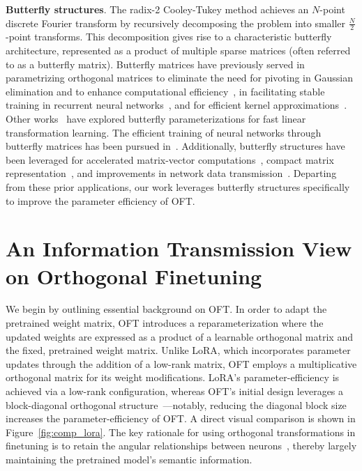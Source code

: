 \textbf{Butterfly structures}. The radix-2 Cooley-Tukey method achieves an $N$-point discrete Fourier transform by recursively decomposing the problem into smaller $\frac{N}{2}$-point transforms. This decomposition gives rise to a characteristic butterfly architecture, represented as a product of multiple sparse matrices (often referred to as a butterfly matrix). Butterfly matrices have previously served in parametrizing orthogonal matrices to eliminate the need for pivoting in Gaussian elimination and to enhance computational efficiency~\cite{parker1995random}, in facilitating stable training in recurrent neural networks~\cite{jing2017tunable}, and for efficient kernel approximations~\cite{munkhoeva2018quadrature}. Other works~\cite{dao2019learning,dao2019kaleidoscope} have explored butterfly parameterizations for fast linear transformation learning. The efficient training of neural networks through butterfly matrices has been pursued in~\cite{chen2022pixelated,dao2022monarch}. Additionally, butterfly structures have been leveraged for accelerated matrix-vector computations~\cite{michielssen1996multilevel,o2010algorithm}, compact matrix representation~\cite{li2015butterfly}, and improvements in network data transmission~\cite{klasing1994broadcasting,li2003linear,rajasingh2016transmission}. Departing from these prior applications, our work leverages butterfly structures specifically to improve the parameter efficiency of OFT.

\section{An Information Transmission View on Orthogonal Finetuning}

We begin by outlining essential background on OFT. In order to adapt the pretrained weight matrix, OFT introduces a reparameterization where the updated weights are expressed as a product of a learnable orthogonal matrix and the fixed, pretrained weight matrix. Unlike LoRA, which incorporates parameter updates through the addition of a low-rank matrix, OFT employs a multiplicative orthogonal matrix for its weight modifications. LoRA's parameter-efficiency is achieved via a low-rank configuration, whereas OFT's initial design leverages a block-diagonal orthogonal structure~\cite{qiu2023controlling}—notably, reducing the diagonal block size increases the parameter-efficiency of OFT. A direct visual comparison is shown in Figure~\ref{fig:comp_lora}. The key rationale for using orthogonal transformations in finetuning is to retain the angular relationships between neurons~\cite{liu2018learning,liu2021orthogonal,qiu2023controlling}, thereby largely maintaining the pretrained model’s semantic information.

